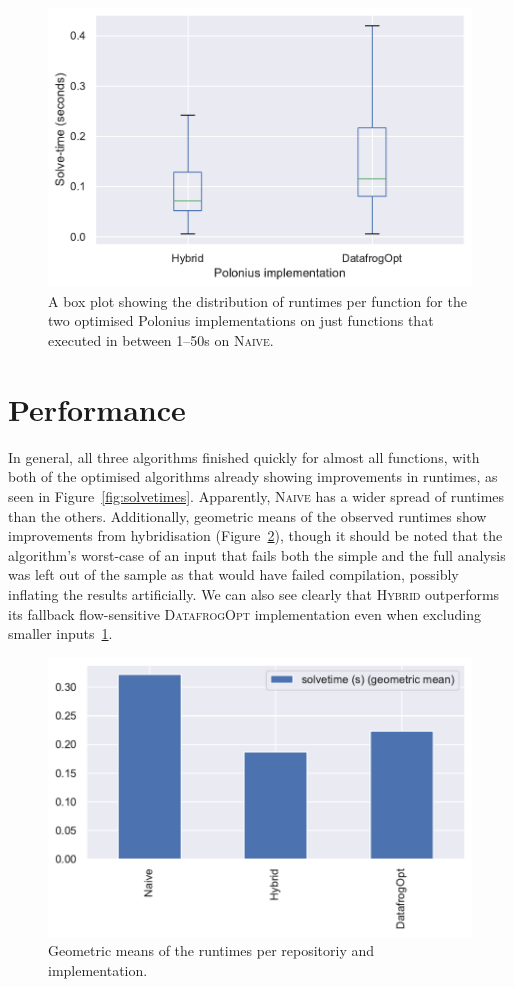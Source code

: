 \documentclass[11pt,a4paper,twoside,openany]{report}
\renewcommand\_{\textunderscore\allowbreak}
\begin{document}
\begin{figure}
  \includegraphics[width=0.9\linewidth]{Graphs/solvetimes_boxplot_over_1s.pdf}
  \caption[Runtimes Per Function for Longer-Running Inputs]{A box plot showing
    the distribution of runtimes per function for the two optimised Polonius
    implementations on just functions that executed in between 1--50s on
    \textsc{Naive}.}\label{fig:solvetimes-long}
\end{figure}

\section{Performance}\label{sec:inputs:performance}

In general, all three algorithms finished quickly for almost all functions, with
both of the optimised algorithms already showing improvements in runtimes, as
seen in Figure~\ref{fig:solvetimes}. Apparently, \textsc{Naive} has a wider
spread of runtimes than the others. Additionally, geometric means of the
observed runtimes show improvements from hybridisation
(Figure~\ref{fig:solvetimes-gmean-repo}), though it should be noted that the
algorithm's worst-case of an input that fails both the simple and the full
analysis was left out of the sample as that would have failed compilation,
possibly inflating the results artificially. We can also see clearly that
\textsc{Hybrid} outperforms its fallback flow-sensitive \textsc{DatafrogOpt}
implementation even when excluding smaller inputs~\ref{fig:solvetimes-long}.

\begin{figure}
  \includegraphics[width=0.5\linewidth]{Graphs/solvetimes_repo_gmean.pdf}
  \caption[Geometric Means of Runtimes Per Repository]{Geometric means of the
    runtimes per repositoriy and implementation.}\label{fig:solvetimes-gmean-repo}
\end{figure}
\end{document}
